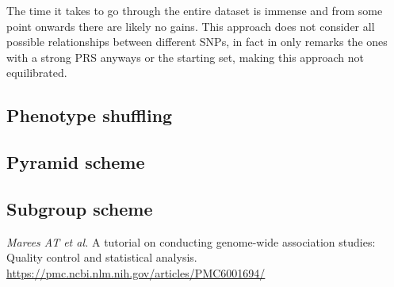 \documentclass[letterpaper, 11pt]{article}
\begin{document}
\begin{figure} [!h] 
\end{figure}

The time it takes to go through the entire dataset is immense and from some point onwards there are likely no gains. This approach does not consider all possible relationships between different SNPs, in fact in only remarks the ones with a strong PRS anyways or the starting set, making this approach not equilibrated. 


\subsection{Phenotype shuffling}
\subsection{Pyramid scheme}
\subsection{Subgroup scheme}

\newpage
\begin{thebibliography}{99}
\emph{Marees AT et al. } A tutorial on conducting genome-wide association studies: Quality control and statistical analysis. \url{https://pmc.ncbi.nlm.nih.gov/articles/PMC6001694/}

\end{thebibliography}
\end{document}
